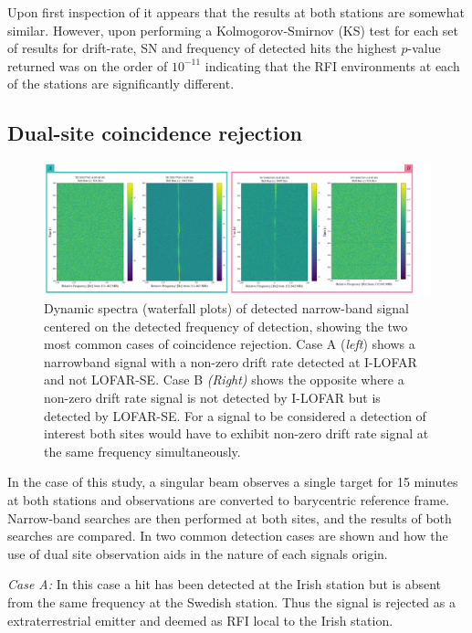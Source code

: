 Upon first inspection of  it appears that the results at both stations are somewhat similar. However, upon performing a Kolmogorov-Smirnov (KS) test for each set of results for drift-rate, SN and frequency of detected hits the highest $p$-value returned was on the order of $10^{-11}$ indicating that the RFI environments at each of the stations are significantly different.

\subsection{Dual-site coincidence rejection}
\begin{figure}[ht]
    \centering
    \includegraphics[width = \textwidth]{SETI/figures/narrowband/grid.png}
    \caption{Dynamic spectra (waterfall plots) of detected narrow-band signal centered on the detected frequency of detection, showing the two most common cases of coincidence rejection. Case A (\textit{left}) shows a narrowband signal with a non-zero drift rate detected at I-LOFAR and not LOFAR-SE. Case B \textit{(Right)} shows the opposite where a non-zero drift rate signal is not detected by I-LOFAR but is detected by LOFAR-SE. For a signal to be considered a detection of interest both sites would have to exhibit non-zero drift rate signal at the same frequency simultaneously. }
    \label{fig:coincidence_cases}
\end{figure}

 In the case of this study, a singular beam observes a single target for 15 minutes at both stations and observations are converted to barycentric reference frame. Narrow-band searches are then performed at both sites, and the results of both searches are compared. In  two common detection cases are shown and how the use of dual site observation aids in the nature of each signals origin. 

\textit{Case A:} In this case a hit has been detected at the Irish station but is absent from the same frequency at the Swedish station. Thus the signal is rejected as a extraterrestrial emitter and deemed as RFI local to the Irish station. \\ 

